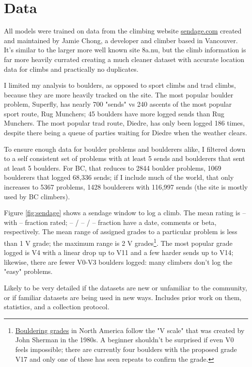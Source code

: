 \documentclass[10pt]{article}
\begin{document}
\section{Data}

All models were trained on data from the climbing website \href{https://sendage.com}{sendage.com} created and maintained by Jamie Chong, a developer and climber based in Vancouver. It's similar to the larger more well known site 8a.nu, but the climb information is far more heavily currated creating a much cleaner dataset with accurate location data for climbs and practically no duplicates. 

I limited my analysis to boulders, as opposed to sport climbs and trad climbs, because they are more heavily tracked on the site. The most popular boulder problem, Superfly, has nearly 700 "sends" vs 240 ascents of the most popular sport route, Rug Munchers; 45 boulders have more logged sends than Rug Munchers. The most popular trad route, Diedre, has only been logged 186 times, despite there being a queue of parties waiting for Diedre when the weather clears. 

To ensure enough data for boulder problems and boulderers alike, I filtered down to a self consistent set of problems with at least 5 sends and boulderers that sent at least 5 boulders. For BC, that reduces to 2844 boulder problems, 1069 boulderers that logged 68,336 sends; if I include much of the world, that only increases to 5367 problems, 1428 boulderers with 116,997 sends (the site is mostly used by BC climbers). 


Figure \ref{fig:sendage} shows a sendage window to log a climb. The mean rating is -- with -- fraction rated; -- / -- / -- fraction have a date, comments or beta, respectively. The mean range of assigned grades to a particular problem is less than 1 V grade; the maximum range is 2 V grades\footnote[1]{\href{https://www.99boulders.com/bouldering-grades}{Bouldering grades} in North America follow the "V scale" that was created by John Sherman in the 1980s. A beginner shouldn't be surprised if even V0 feels impossible; there are currently four boulders with the proposed grade V17 and only one of these has seen repeats to confirm the grade.}. The most popular grade logged is V4 with a linear drop up to V11 and a few harder sends up to V14; likewise, there are fewer V0-V3 boulders logged: many climbers don't log the "easy" problems. 



Likely to be very detailed if the datasets are new or unfamiliar to the community, or if familiar datasets are being used in new ways.
Includes prior work on them, statistics, and a collection protocol. 
\end{document}
